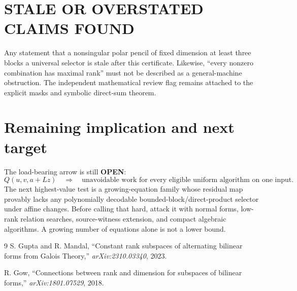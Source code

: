 \documentclass[11pt]{article}
\newcommand{\OPEN}{\textbf{OPEN}}
\begin{document}
\section{STALE OR OVERSTATED CLAIMS FOUND}
Any statement that a nonsingular polar pencil of fixed dimension at least
three blocks a universal selector is stale after this certificate.  Likewise,
``every nonzero combination has maximal rank'' must not be described as a
general-machine obstruction.  The independent mathematical review flag
remains attached to the explicit masks and symbolic direct-sum theorem.

\section{Remaining implication and next target}
The load-bearing arrow is still \OPEN{}:
\[
 Q(u,v,a+Lz)\quad\Longrightarrow\quad
 \text{unavoidable work for every eligible uniform algorithm on one input}.
\]
The next highest-value test is a growing-equation family whose residual map
provably lacks any polynomially decodable bounded-block/direct-product
selector under affine changes.  Before calling that hard, attack it with
normal forms, low-rank relation searches, source-witness extension, and
compact algebraic algorithms.  A growing number of equations alone is not a
lower bound.

\begin{thebibliography}{9}
S. Gupta and R. Mandal,
``Constant rank subspaces of alternating bilinear forms from Galois Theory,''
\emph{arXiv:2310.03340}, 2023.

R. Gow,
``Connections between rank and dimension for subspaces of bilinear forms,''
\emph{arXiv:1801.07529}, 2018.
\end{thebibliography}
\end{document}
